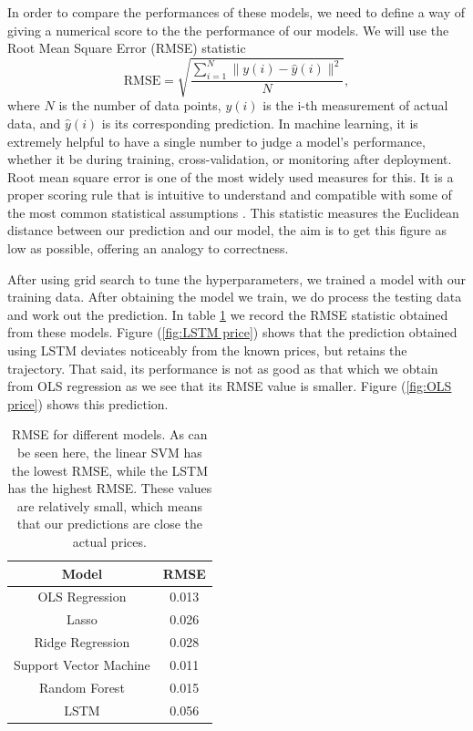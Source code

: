 \documentclass[twoside]{report}
\begin{document}
\begin{spacing}{1}
In order to compare the performances of these models, we need to define a way of giving a numerical score to the the performance of our models. We will use the Root Mean Square Error (RMSE) statistic
\[\textrm{RMSE} =\sqrt{\frac{\sum_{i=1}^{N}\|y(i)-\hat{y}(i)\|^{2}}{N}},\] where $N$ is the number of data points, $y(i)$ is the i-th measurement of actual data, and $\hat{y}(i)$ is its corresponding prediction. In machine learning, it is extremely helpful to have a single number to judge a model’s performance, whether it be during training, cross-validation, or monitoring after deployment. Root mean square error is one of the most widely used measures for this. It is a proper scoring rule that is intuitive to understand and compatible with some of the most common statistical assumptions \cite{hyndman2006another}. This statistic measures the Euclidean distance between our prediction and our model, the aim is to get this figure as low as possible, offering an analogy to correctness.  

After using grid search to tune the hyperparameters, we trained a model with our training data. After obtaining the model we train, we do process the testing data and work out the prediction. In table \ref{tab:RMSE} we record the RMSE statistic obtained from these models. Figure (\ref{fig:LSTM price}) shows that the prediction obtained using LSTM deviates noticeably from the known prices, but retains the trajectory. That said, its performance is not as good as that which we obtain from OLS regression as we see that its RMSE value is smaller. Figure (\ref{fig:OLS price}) shows this prediction.
\begin{table}[]
    \centering
    \begin{tabular}{|c|c|}
    \hline
        Model & RMSE\\ \hline
         OLS Regression& 0.013         \\
         Lasso& 0.026\\
         Ridge Regression& 0.028\\
         Support Vector Machine& 0.011      \\
         Random Forest &  0.015       \\
         LSTM & 0.056\\
    \hline
    \end{tabular}
    \caption{RMSE for different models. As can be seen here, the linear SVM has the lowest RMSE, while the LSTM has the highest RMSE. These values are relatively small, which means that our predictions are close the actual prices.}
    \label{tab:RMSE}
\end{table}



\end{spacing}
\end{document}
